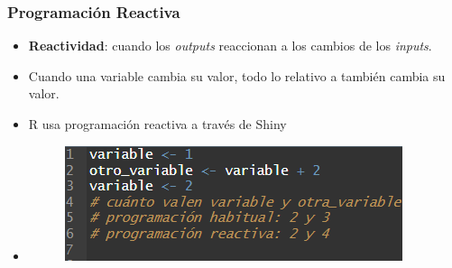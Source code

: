 \begin{frame}
    \frametitle{Programación Reactiva}
    \begin{itemize}
        \item<1-> \textbf{Reactividad}: cuando los \textit{outputs} reaccionan a los cambios de los \textit{inputs}.
        \item<2-> Cuando una variable  cambia su valor, todo lo relativo a  también cambia su valor. 
        \item<3->  R usa programación reactiva a través de Shiny
        \item<4->[]
        \begin{figure}[h!]
            \centering
                \includegraphics[scale=0.6]{Imagenes/03_Reactividad.png}
            \label{fig:fig3}
            \end{figure} 
  \end{itemize}
\end{frame}